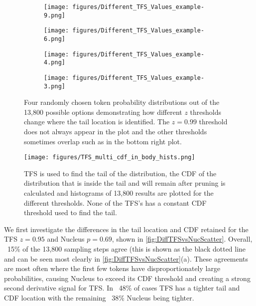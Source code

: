 \documentclass{article}
\begin{document}
\begin{figure}[h]
  \begin{subfigure}{.5\textwidth}
    \centering
    \texttt{[image: figures/Different\_TFS\_Values\_example-9.png]}
  \end{subfigure}
  \hfill
  \begin{subfigure}{.5\textwidth}
    \centering
    \texttt{[image: figures/Different\_TFS\_Values\_example-6.png]}
  \end{subfigure}

  \medskip

  \begin{subfigure}[t]{0.5\textwidth}
    \centering
    \texttt{[image: figures/Different\_TFS\_Values\_example-4.png]}
  \end{subfigure}
  \hfill
  \begin{subfigure}[t]{0.5\textwidth}
    \centering
    \texttt{[image: figures/Different\_TFS\_Values\_example-3.png]}
  \end{subfigure}
  \caption{Four randomly chosen token probability distributions out of the 13,800 possible options demonstrating how different $z$ thresholds change where the tail location is identified. The $z=0.99$ threshold does not always appear in the plot and the other thresholds sometimes overlap such as in the bottom right plot.}
  \label{fig:DiffTFSCuts}
\end{figure}

\begin{figure}[h]
    \texttt{[image: figures/TFS\_multi\_cdf\_in\_body\_hists.png]}
    \caption{TFS is used to find the tail of the distribution, the CDF of the distribution that is inside the tail and will remain after pruning is calculated and histograms of 13,800 results are plotted for the different thresholds. None of the TFS's has a constant CDF threshold used to find the tail.}
    \label{fig:DiffTFSCDF}
\end{figure}

We first investigate the differences in the tail location and CDF retained for the TFS $z=0.95$ and Nucleus $p=0.69$, shown in \ref{fig:DiffTFSvsNucScatter}. Overall, ~15\% of the 13,800 sampling steps agree (this is shown as the black dotted line and can be seen most clearly in \ref{fig:DiffTFSvsNucScatter}(a). These agreements are most often where the first few tokens have disproportionately large probabilities, causing Nucleus to exceed its CDF threshold and creating a strong second derivative signal for TFS. In ~48\% of cases TFS has a tighter tail and CDF location with the remaining ~38\% Nucleus being tighter. 
\end{document}

